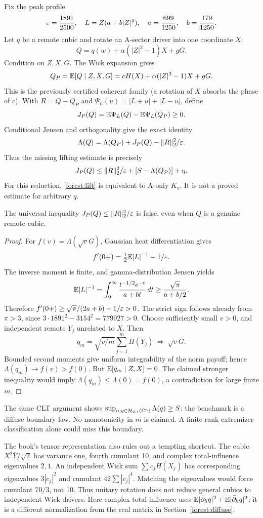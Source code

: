 Fix the peak profile
\[
\varepsilon=\frac{1891}{2500},\quad
L=Z(a+b|Z|^2),\quad a=\frac{699}{1250},\quad b=\frac{179}{1250}.
\]
Let \(q\) be a remote cubic and rotate an A-sector driver into one
coordinate \(X\):
\[
Q=q(w)+\alpha(|Z|^2-1)X+gG.
\]
Condition on \(Z,X,G\). The Wick expansion gives
\[
Q_P=\mathbb E[Q\mid Z,X,G]
   =cH(X)+\alpha(|Z|^2-1)X+gG.
\]
This is the previously certified coherent family (a rotation of \(X\)
absorbs the phase of \(c\)). With \(R=Q-Q_P\) and
\(\Psi_L(u)=|L+u|+|L-u|\), define
\[
J_P(Q)=\mathbb E\Psi_L(Q)-\mathbb E\Psi_L(Q_P)\ge0.
\]
Conditional Jensen and orthogonality give the exact identity
\[
\Lambda(Q)=\Lambda(Q_P)+J_P(Q)-\|R\|_2^2/\varepsilon.
\]
Thus the missing lifting estimate is precisely
\begin{equation}\label{forest:lift}
J_P(Q)\le\|R\|_2^2/\varepsilon+[S-\Lambda(Q_P)]+\eta.
\end{equation}
For this reduction, \eqref{forest:lift} is equivalent to A-only
\(K_\eta\). It is not a proved estimate for arbitrary \(q\).

\begin{proposition}
The universal inequality \(J_P(Q)\le\|R\|_2^2/\varepsilon\) is false,
even when \(Q\) is a genuine remote cubic.
\end{proposition}
\begin{proof}
For \(f(v)=\Lambda(\sqrt vG)\), Gaussian heat differentiation gives
\[
f'(0+)=\tfrac12\mathbb E|L|^{-1}-1/\varepsilon.
\]
The inverse moment is finite, and gamma-distribution Jensen yields
\[
\mathbb E|L|^{-1}
=\int_0^\infty\frac{t^{-1/2}e^{-t}}{a+bt}\,dt
\ge\frac{\sqrt\pi}{a+b/2}.
\]
Therefore \(f'(0+)\ge\sqrt\pi/(2a+b)-1/\varepsilon>0\).
The strict sign follows already from \(\pi>3\), since
\(3\cdot1891^2-3154^2=779927>0\).
Choose sufficiently small \(v>0\), and independent remote
\(Y_j\) unrelated to \(X\). Then
\[
q_m=\sqrt{v/m}\sum_{j=1}^mH(Y_j)
 \ \Longrightarrow\ \sqrt vG .
\]
Bounded second moments give uniform integrability of the norm
payoff; hence \(\Lambda(q_m)\to f(v)>f(0)\).
But \(\mathbb E[q_m\mid Z,X]=0\).
The claimed stronger inequality would imply
\(\Lambda(q_m)\le\Lambda(0)=f(0)\), a contradiction for large finite \(m\).
\end{proof}

The same CLT argument shows
\(\sup_{n,q\in\mathcal H_{2,1}(\mathbb C^n)}\Lambda(q)\ge S\):
the benchmark is a diffuse boundary law. No monotonicity in \(m\)
is claimed. A finite-rank extremizer classification alone could miss
this boundary.

The book's tensor representation also rules out a tempting shortcut.
The cubic \(X^2\bar Y/\sqrt2\) has variance one, fourth cumulant 10,
and complex total-influence eigenvalues \(2,1\).
An independent Wick sum \(\sum c_jH(X_j)\) has corresponding
eigenvalues \(3|c_j|^2\) and cumulant \(42\sum|c_j|^4\).
Matching the eigenvalues would force cumulant \(70/3\), not 10.
Thus unitary rotation does not reduce general cubics to independent
Wick drivers. Here complex total influence uses
\(\mathbb E|\partial_hq|^2+\mathbb E|\bar\partial_hq|^2\);
it is a different normalization from the real matrix in
Section~\ref{forest:diffuse}.

